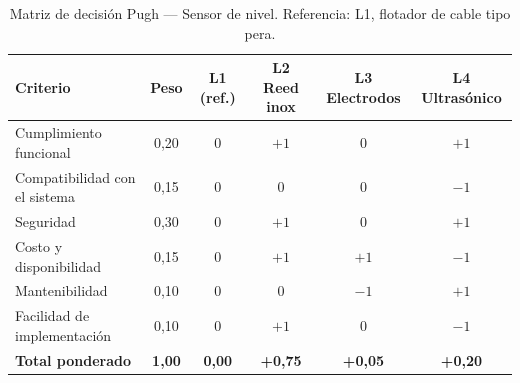 \begin{table}[H]
\centering
\caption{Matriz de decisión Pugh --- Sensor de nivel. Referencia: L1, flotador de cable tipo pera.}
\label{tab:pugh-nivel}
\begin{tabularx}{\textwidth}{Xccccc}
\toprule
\textbf{Criterio} & \textbf{Peso} & \textbf{L1 (ref.)} & \textbf{L2 Reed inox} & \textbf{L3 Electrodos} & \textbf{L4 Ultrasónico} \\
\midrule
Cumplimiento funcional        & 0,20 & 0 & $+1$ & 0    & $+1$ \\
Compatibilidad con el sistema & 0,15 & 0 & 0    & 0    & $-1$ \\
Seguridad                     & 0,30 & 0 & $+1$ & 0    & $+1$ \\
Costo y disponibilidad        & 0,15 & 0 & $+1$ & $+1$ & $-1$ \\
Mantenibilidad                & 0,10 & 0 & 0    & $-1$ & $+1$ \\
Facilidad de implementación   & 0,10 & 0 & $+1$ & 0    & $-1$ \\
\midrule
\textbf{Total ponderado}      & \textbf{1,00} & \textbf{0,00} & \textbf{+0,75} & \textbf{+0,05} & \textbf{+0,20} \\
\bottomrule
\end{tabularx}
\end{table}

